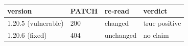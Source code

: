 \footnotesize
\setlength{\tabcolsep}{4pt}
\begin{tabular}{@{}llll@{}}
\toprule
version & PATCH & re-read & verdict \\
\midrule
1.20.5 (vulnerable) & 200 & changed & true positive \\
1.20.6 (fixed) & 404 & unchanged & no claim \\
\bottomrule
\end{tabular}
